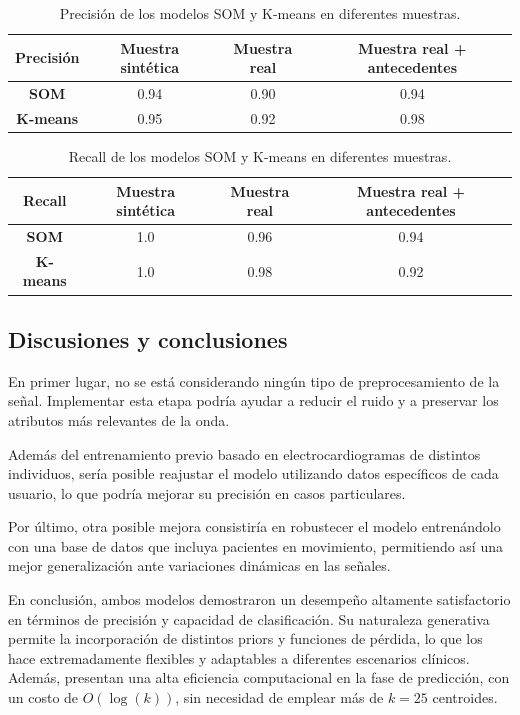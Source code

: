 \documentclass[titlepage,a4paper]{article}
\begin{document}
\begin{table}[H]
    \centering
    \begin{tabular}{|c|c|c|c|}
        \hline
        \textbf{Precisión} & \textbf{Muestra sintética} & \textbf{Muestra real} & \textbf{Muestra real + antecedentes} \\ \hline
        \textbf{SOM} & 0.94 & 0.90 & 0.94 \\ \hline
        \textbf{K-means} & 0.95 & 0.92 & 0.98 \\ \hline
    \end{tabular}
    \caption{Precisión de los modelos SOM y K-means en diferentes muestras.}
    \label{tab:precision}
\end{table}
\begin{table}[H]
    \centering
    \begin{tabular}{|c|c|c|c|}
        \hline
        \textbf{Recall} & \textbf{Muestra sintética} & \textbf{Muestra real} & \textbf{Muestra real + antecedentes} \\ \hline
        \textbf{SOM} & 1.0 & 0.96 & 0.94 \\ \hline
        \textbf{K-means} & 1.0 & 0.98 & 0.92 \\ \hline
    \end{tabular}
    \caption{Recall de los modelos SOM y K-means en diferentes muestras.}
    \label{tab:precision}
\end{table}
\subsection{Discusiones y conclusiones}
En primer lugar, no se está considerando ningún tipo de preprocesamiento de la señal. Implementar esta etapa podría ayudar a reducir el ruido y a preservar los atributos más relevantes de la onda.  

Además del entrenamiento previo basado en electrocardiogramas de distintos individuos, sería posible reajustar el modelo utilizando datos específicos de cada usuario, lo que podría mejorar su precisión en casos particulares.  

Por último, otra posible mejora consistiría en robustecer el modelo entrenándolo con una base de datos que incluya pacientes en movimiento, permitiendo así una mejor generalización ante variaciones dinámicas en las señales.

En conclusión, ambos modelos demostraron un desempeño altamente satisfactorio en términos de precisión y capacidad de clasificación. Su naturaleza generativa permite la incorporación de distintos priors y funciones de pérdida, lo que los hace extremadamente flexibles y adaptables a diferentes escenarios clínicos. Además, presentan una alta eficiencia computacional en la fase de predicción, con un costo de $O(\log(k))$, sin necesidad de emplear más de $k=25$ centroides.
\end{document}
